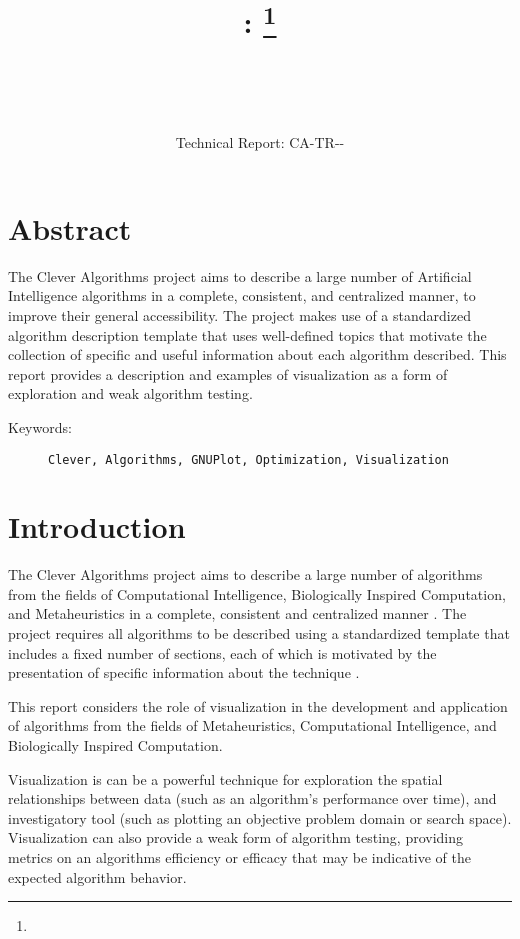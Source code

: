 \documentclass[a4paper, 11pt]{article}
\title{{\myreporttitle}: {\myreportsubtitle}\footnote{\myreportlicense}}
\author{\myreportauthor\\{\myreportemail}\\\small\myreportproject}
\date{\myreportfulldate\\{\small{Technical Report: CA-TR-{\myreportdate}-\myreportversion}}}
\begin{document}
\maketitle

\section*{Abstract} 
The Clever Algorithms project aims to describe a large number of Artificial Intelligence algorithms in a complete, consistent, and centralized manner, to improve their general accessibility. 
The project makes use of a standardized algorithm description template that uses well-defined topics that motivate the collection of specific and useful information about each algorithm described.
This report provides a description and examples of visualization as a form of exploration and weak algorithm testing. 

\begin{description}
	\item[Keywords:] {\small\texttt{Clever, Algorithms, GNUPlot, Optimization, Visualization}}
\end{description} 

\section{Introduction}
\label{sec:introduction}
The Clever Algorithms project aims to describe a large number of algorithms from the fields of Computational Intelligence, Biologically Inspired Computation, and Metaheuristics in a complete, consistent and centralized manner \cite{Brownlee2010}.
The project requires all algorithms to be described using a standardized template that includes a fixed number of sections, each of which is motivated by the presentation of specific information about the technique \cite{Brownlee2010a}.

This report considers the role of visualization in the development and application of algorithms from the fields of Metaheuristics, Computational Intelligence, and Biologically Inspired Computation.

Visualization is can be a powerful technique for exploration the spatial relationships between data (such as an algorithm's performance over time), and investigatory tool (such as plotting an objective problem domain or search space). Visualization can also provide a weak form of algorithm testing, providing metrics on an algorithms efficiency or efficacy that may be indicative of the expected algorithm behavior.
\end{document}
